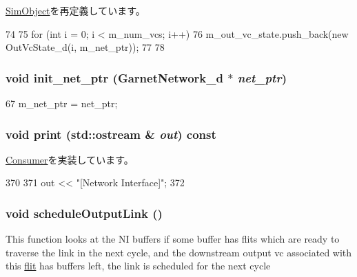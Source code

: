 \hyperlink{classSimObject_a02fd73d861ef2e4aabb38c0c9ff82947}{SimObject}を再定義しています。


\begin{DoxyCode}
74 {
75     for (int i = 0; i < m_num_vcs; i++) {
76         m_out_vc_state.push_back(new OutVcState_d(i, m_net_ptr));
77     }
78 }
\end{DoxyCode}
\hypertarget{classNetworkInterface__d_adb63d5adcd3ba8d6d0c6336d7b716243}{
\subsubsection[{init\_\-net\_\-ptr}]{\setlength{\rightskip}{0pt plus 5cm}void init\_\-net\_\-ptr ({\bf GarnetNetwork\_\-d} $\ast$ {\em net\_\-ptr})}}
\label{classNetworkInterface__d_adb63d5adcd3ba8d6d0c6336d7b716243}



\begin{DoxyCode}
67 { m_net_ptr = net_ptr; }
\end{DoxyCode}
\hypertarget{classNetworkInterface__d_ac55fe386a101fbae38c716067c9966a0}{
\subsubsection[{print}]{\setlength{\rightskip}{0pt plus 5cm}void print (std::ostream \& {\em out}) const}}
\label{classNetworkInterface__d_ac55fe386a101fbae38c716067c9966a0}


\hyperlink{classConsumer_a3ea5f7af5db62cc24f4e40df9ea5c971}{Consumer}を実装しています。


\begin{DoxyCode}
370 {
371     out << "[Network Interface]";
372 }
\end{DoxyCode}
\hypertarget{classNetworkInterface__d_a0b5091af4210988da9a7eeb44e5691e4}{
\subsubsection[{scheduleOutputLink}]{\setlength{\rightskip}{0pt plus 5cm}void scheduleOutputLink ()}}
\label{classNetworkInterface__d_a0b5091af4210988da9a7eeb44e5691e4}
This function looks at the NI buffers if some buffer has flits which are ready to traverse the link in the next cycle, and the downstream output vc associated with this \hyperlink{classflit}{flit} has buffers left, the link is scheduled for the next cycle 


